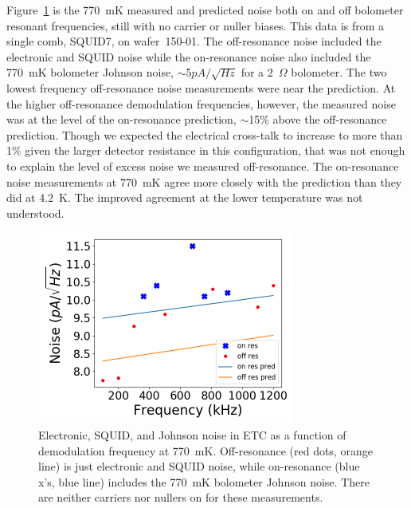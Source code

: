 Figure~\ref{fig:770mK_squid_noise} is the 770~mK measured and predicted noise both on and off bolometer resonant frequencies, still with no carrier or nuller biases.
This data is from a single comb, \ac{SQUID}7, on wafer~150-01. 
The off-resonance noise included the electronic and \ac{SQUID} noise while the on-resonance noise also included the 770~mK bolometer Johnson noise, $\sim$5$pA/\sqrt{Hz}$ for a 2~$\Omega$ bolometer. 
The two lowest frequency off-resonance noise measurements were near the prediction. 
At the higher off-resonance demodulation frequencies, however, the measured noise was at the level of the on-resonance prediction, $\sim$15\% above the off-resonance prediction.
Though we expected the electrical cross-talk to increase to more than 1\% given the larger detector resistance in this configuration, that was not enough to explain the level of excess noise we measured off-resonance. 
The on-resonance noise measurements at 770~mK agree more closely with the prediction than they did at 4.2~K. 
The improved agreement at the lower temperature was not understood. 

\begin{figure}[htp]
\begin{center}
\includegraphics[height=2.5in]{figures/squid_noise_770mK.png}
\caption{Electronic, \ac{SQUID}, and Johnson noise in \ac{ETC} as a function of demodulation frequency at 770~mK. Off-resonance (red dots, orange line) is just electronic and \ac{SQUID} noise, while on-resonance (blue x's, blue line) includes the 770~mK bolometer Johnson noise. There are neither carriers nor nullers on for these measurements. 
\label{fig:770mK_squid_noise} }
\end{center}
\end{figure}

